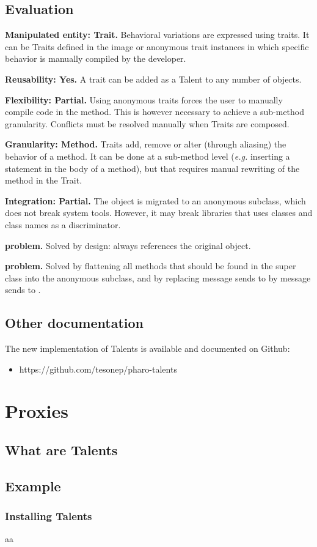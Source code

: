 \documentclass[10pt,twoside,english]{_support/latex/sbabook/sbabook}
\begin{document}
\section{Evaluation}
\textbf{Manipulated entity: Trait.} Behavioral variations are expressed using traits. It can be Traits defined in the image or anonymous trait instances in which specific behavior is manually compiled by the developer.

\textbf{Reusability: Yes.} A trait can be added as a Talent to any number of objects.

\textbf{Flexibility: Partial.} Using anonymous traits forces the user to manually compile code in the method. This is however necessary to achieve a sub-method granularity. Conflicts must be resolved manually when Traits are composed.

\textbf{Granularity: Method.} Traits add, remove or alter (through aliasing) the behavior of a method. It can be done at a sub-method level (\textit{e.g.} inserting a statement in the body of a method), but that requires manual rewriting of the method in the Trait.

\textbf{Integration: Partial.} The object is migrated to an anonymous subclass, which does not break system tools. However, it may break libraries that uses classes and class names as a discriminator.

\textbf{ problem.} Solved by design:  always references the original object.

\textbf{ problem.} Solved by flattening all methods that should be found in the super class into the anonymous subclass, and by replacing message sends to  by message sends to .
\section{Other documentation}
The new implementation of Talents is available and documented on Github:

\begin{itemize}
\item https://github.com/tesonep/pharo-talents
\end{itemize}
\chapter{Proxies}\section{What are Talents}\section{Example}\subsection{Installing Talents}
aa
\end{document}

